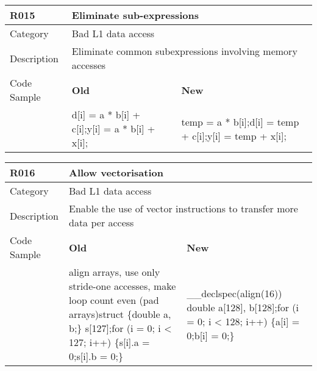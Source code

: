 \begin{tabular}{|p{0.9in}|p{2.0in}|p{2.0in}|} \hline
\textbf{R015}       & \multicolumn{2}{|p{4.0in}|}{\textbf{Eliminate sub-expressions}} \\ \hline
Category            & \multicolumn{2}{|p{4.0in}|}{Bad L1 data access} \\ \hline
Description         & \multicolumn{2}{|p{4.0in}|}{Eliminate common subexpressions involving memory accesses} \\ \hline
Code Sample         & \textbf{Old} & \textbf{New} \\ \hline
                    & d[i] = a * b[i] + c[i];\newline y[i] = a * b[i] + x[i];
                    & temp = a * b[i];\newline d[i] = temp + c[i];\newline y[i] = temp + x[i]; \\ \hline
\end{tabular}

\begin{tabular}{|p{0.9in}|p{2.0in}|p{2.0in}|} \hline
\textbf{R016}       & \multicolumn{2}{|p{4.0in}|}{\textbf{Allow vectorisation}} \\ \hline
Category            & \multicolumn{2}{|p{4.0in}|}{Bad L1 data access} \\ \hline
Description         & \multicolumn{2}{|p{4.0in}|}{Enable the use of vector instructions to transfer more data per access} \\ \hline
Code Sample         & \textbf{Old} & \textbf{New} \\ \hline
                    & align arrays, use only stride-one accesses, make loop count even (pad arrays)\newline struct \{\newline   double a, b;\newline \} s[127];\newline for (i = 0; i <{} 127; i++) \{\newline   s[i].a = 0;\newline   s[i].b = 0;\newline \}
                    & \_\_declspec(align(16)) double a[128], b[128];\newline for (i = 0; i <{} 128; i++) \{\newline   a[i] = 0;\newline   b[i] = 0;\newline \} \\ \hline
\end{tabular}

